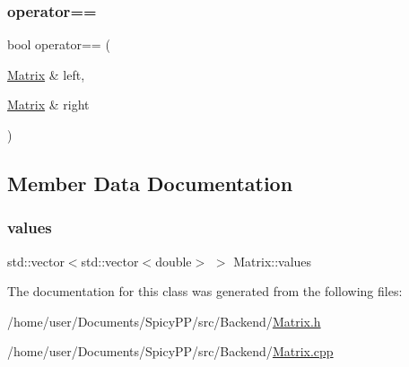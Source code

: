\subsubsection{\texorpdfstring{operator==}{operator==}}
{\footnotesize\ttfamily bool operator== (\begin{DoxyParamCaption}\item[{\hyperlink{classMatrix}{Matrix} \&}]{left,  }\item[{\hyperlink{classMatrix}{Matrix} \&}]{right }\end{DoxyParamCaption})\hspace{0.3cm}{\ttfamily [friend]}}



\subsection{Member Data Documentation}
\mbox{\label{classMatrix_a5987175ae045377790ff0b1f6cfd2e7b}} 
\subsubsection{\texorpdfstring{values}{values}}
{\footnotesize\ttfamily std\+::vector$<$std\+::vector$<$double$>$ $>$ Matrix\+::values\hspace{0.3cm}{\ttfamily [private]}}



The documentation for this class was generated from the following files\+:\begin{DoxyCompactItemize}
\item 
/home/user/\+Documents/\+Spicy\+P\+P/src/\+Backend/\hyperlink{Matrix_8h}{Matrix.\+h}\item 
/home/user/\+Documents/\+Spicy\+P\+P/src/\+Backend/\hyperlink{Matrix_8cpp}{Matrix.\+cpp}\end{DoxyCompactItemize}
